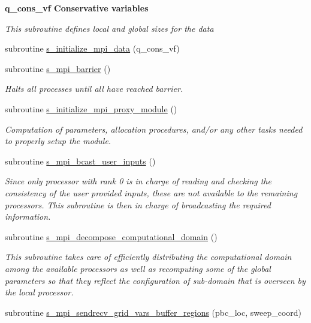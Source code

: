 \begin{Indent}\textbf{ q\+\_\+cons\+\_\+vf Conservative variables}\par
{\em This subroutine defines local and global sizes for the data }\begin{DoxyCompactItemize}
\item 
subroutine \hyperlink{namespacem__mpi__proxy_a2ff35ede51e90c483969e44c31303415}{s\+\_\+initialize\+\_\+mpi\+\_\+data} (q\+\_\+cons\+\_\+vf)
\item 
subroutine \hyperlink{namespacem__mpi__proxy_abfbc42cea69273bc9fa4a2d78f636eb1}{s\+\_\+mpi\+\_\+barrier} ()
\begin{DoxyCompactList}\small\item\em Halts all processes until all have reached barrier. \end{DoxyCompactList}\item 
subroutine \hyperlink{namespacem__mpi__proxy_a015ee2c0892e9cfcb858da8f27b646d5}{s\+\_\+initialize\+\_\+mpi\+\_\+proxy\+\_\+module} ()
\begin{DoxyCompactList}\small\item\em Computation of parameters, allocation procedures, and/or any other tasks needed to properly setup the module. \end{DoxyCompactList}\item 
subroutine \hyperlink{namespacem__mpi__proxy_a69660c5fe9302a8c0496b622fa3b5286}{s\+\_\+mpi\+\_\+bcast\+\_\+user\+\_\+inputs} ()
\begin{DoxyCompactList}\small\item\em Since only processor with rank 0 is in charge of reading and checking the consistency of the user provided inputs, these are not available to the remaining processors. This subroutine is then in charge of broadcasting the required information. \end{DoxyCompactList}\item 
subroutine \hyperlink{namespacem__mpi__proxy_a80c5e235786545276fe6ffa06965017f}{s\+\_\+mpi\+\_\+decompose\+\_\+computational\+\_\+domain} ()
\begin{DoxyCompactList}\small\item\em This subroutine takes care of efficiently distributing the computational domain among the available processors as well as recomputing some of the global parameters so that they reflect the configuration of sub-\/domain that is overseen by the local processor. \end{DoxyCompactList}\item 
subroutine \hyperlink{namespacem__mpi__proxy_a8e48d59a04981a6594f25ad7a7562492}{s\+\_\+mpi\+\_\+sendrecv\+\_\+grid\+\_\+vars\+\_\+buffer\+\_\+regions} (pbc\+\_\+loc, sweep\+\_\+coord)

\end{DoxyCompactItemize}
\end{Indent}
